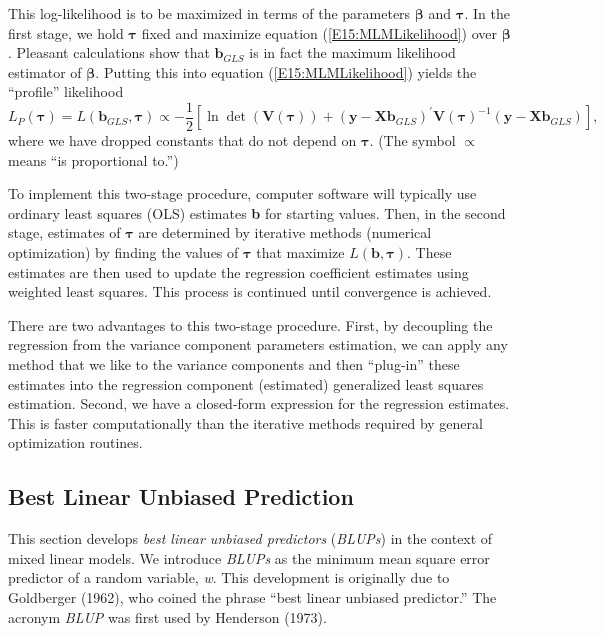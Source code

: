 \noindent This log-likelihood is to be maximized in terms of the
parameters $\boldsymbol \beta$ and $\boldsymbol \tau$. In the first
stage, we hold $\boldsymbol \tau$ fixed and maximize equation
(\ref{E15:MLMLikelihood}) over $\boldsymbol \beta$. Pleasant
calculations show that $\mathbf{b}_{GLS}$ is in fact the maximum
likelihood estimator of $\boldsymbol \beta$. Putting this into
equation (\ref{E15:MLMLikelihood}) yields the ``profile'' likelihood
\begin{equation}\label{E15:MLMProfileLikelihood}
L_P(\boldsymbol \tau ) = L(\mathbf{b}_{GLS}, \boldsymbol \tau )
\propto - \frac{1}{2}\left[  \ln \det (\mathbf{V (\boldsymbol
\tau)}) + (\mathbf{y} - \mathbf{X} \mathbf{b}_{GLS})^{\prime}
\mathbf{V (\boldsymbol \tau)}^{-1} (\mathbf{y} - \mathbf{X}
\mathbf{b}_{GLS}) \right] ,
\end{equation}
where we have dropped constants that do not depend on $\boldsymbol
\tau$. (The symbol $\propto$ means ``is proportional to.'')

To implement this two-stage procedure, computer software will
typically use ordinary least squares (OLS) estimates \textbf{b} for
starting values. Then, in the second stage, estimates of
$\boldsymbol \tau$ are determined by iterative methods (numerical
optimization) by finding the values of $\boldsymbol \tau$ that
maximize $L(\mathbf{b},\boldsymbol \tau)$. These estimates are then
used to update the regression coefficient estimates using weighted
least squares. This process is continued until convergence is
achieved.

There are two advantages to this two-stage procedure. First, by
decoupling the regression from the variance component parameters
estimation, we can apply any method that we like to the variance
components and then ``plug-in'' these estimates into the regression
component (estimated) generalized least squares estimation. Second,
we have a closed-form expression for the regression estimates. This
is faster computationally than the iterative methods required by
general optimization routines.

\subsection{Best Linear Unbiased Prediction}

This section develops \emph{best linear unbiased predictors}
(\emph{BLUPs}) in the context of mixed linear models. We introduce
\textit{BLUPs} as the minimum mean square error predictor of a
random variable, \textit{w}. This development is originally due to
Goldberger (1962), who coined the phrase ``best linear unbiased
predictor.'' The acronym \emph{BLUP} was first used by Henderson
(1973).

